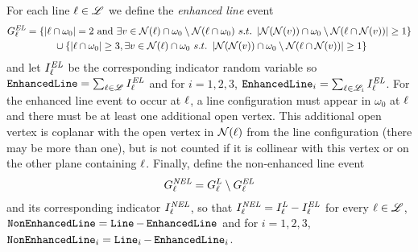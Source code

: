 For each line $\ell \in \mathscr{L}$ we define the {\em enhanced line} event
\begin{align*}
\event^{\text{\em EL}}_\Ln &= \{ \abs{\Ln \cap \omega_0} =2 \text{ and } \exists \vect{v}\in \mathcal{N}(\Ln)\cap \omega_0\setminus \mathcal{N}(\Ln \cap \omega_0) \ s.t.\ \abs{\mathcal{N}(\mathcal{N}(\vect{v})) \cap \omega_0 \setminus \mathcal{N}(\Ln \cap \mathcal{N}(v))}\geq 1\} \\
& \hspace{1cm} \cup \{ \abs{\Ln \cap \omega_0} \geq 3,  \exists \vect{v}\in \mathcal{N}(\Ln)\cap \omega_0 \ s.t.\ \abs{\mathcal{N}(\mathcal{N}(\vect{v})) \cap \omega_0 \setminus \mathcal{N}(\Ln \cap \mathcal{N}(v))}\geq 1 \} 
\end{align*}
and let $I^{\text{\em EL}}_\ell$ be the corresponding indicator random variable so $\operatorname{\tt Enhanced Line} = \sum_{\ell \in \mathscr{L}} I^{\text{\em EL}}_\ell$ and for $i=1,2,3$, $\operatorname{\tt Enhanced Line}_i =  \sum_{\ell \in \mathscr{L}_i} I^{\text{\em EL}}_\ell$.  For the enhanced line event to occur at $\ell$, a line configuration must appear in $\omega_0$ at $\ell$ and there must be at least one additional open vertex.  This additional open vertex is coplanar with the open vertex in $\mathcal{N}(\ell)$ from the line configuration (there may be more than one), but is not counted if it is collinear with this vertex or on the other plane containing $\ell$.  Finally, define the non-enhanced line event
\begin{align*}
G^{\text{\em NEL}}_\ell = G^{L}_\ell \setminus G^{\text{\em EL}}_\ell
\end{align*}
and its corresponding indicator $I^{\text{\em NEL}}_\ell$, so that $I^{\text{\em NEL}}_\ell = I^{\text{\em L}}_\ell - I^{\text{\em EL}}_\ell$ for every $\ell \in \mathscr{L}$, $\operatorname{\tt NonEnhancedLine} = \operatorname{\tt Line} - \operatorname{\tt Enhanced Line}$ and for $i=1,2,3$, $\operatorname{\tt NonEnhancedLine}_i = \operatorname{\tt Line}_i - \operatorname{\tt Enhanced Line}_i$.

